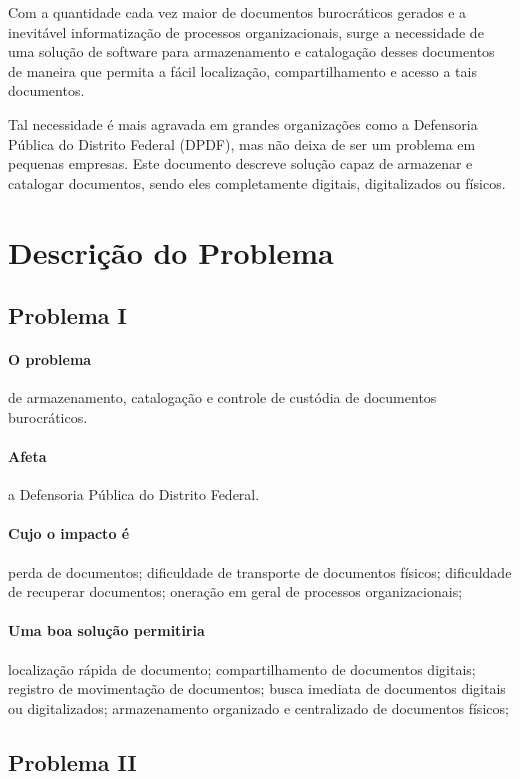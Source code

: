 \documentclass[12pt,a4paper]{report}
\begin{document}
Com a quantidade cada vez maior de documentos burocráticos gerados e a inevitável informatização de processos organizacionais, surge a necessidade de uma solução de software para armazenamento e catalogação desses documentos de maneira que permita a fácil localização, compartilhamento e acesso a tais documentos.

Tal necessidade é mais agravada em grandes organizações como a Defensoria Pública do Distrito Federal (DPDF), mas não deixa de ser um problema em pequenas empresas. Este documento descreve solução capaz de armazenar e catalogar documentos, sendo eles completamente digitais, digitalizados ou físicos.

\section{Descrição do Problema}

\subsection*{Problema I}
\paragraph{O problema} de armazenamento, catalogação e controle de custódia de documentos burocráticos.
\paragraph{Afeta} a Defensoria Pública do Distrito Federal.
\paragraph{Cujo o impacto é} perda de documentos; dificuldade de transporte de documentos físicos; dificuldade de recuperar documentos; oneração em geral de processos organizacionais;
\paragraph{Uma boa solução permitiria} localização rápida de documento; compartilhamento de documentos digitais; registro de movimentação de documentos; busca imediata de documentos digitais ou digitalizados; armazenamento organizado e centralizado de documentos físicos;

\subsection*{Problema II}
\end{document}

